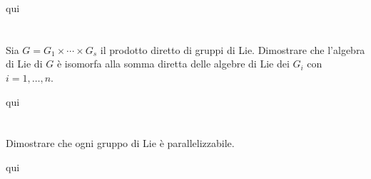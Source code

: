 qui

\section{}\label{es3-11}

\begin{tcolorbox}
	Sia $ G = G_{1} \times \cdots \times G_{s} $ il prodotto diretto di gruppi di Lie. Dimostrare che l'algebra di Lie di $ G $ è isomorfa alla somma diretta delle algebre di Lie dei $ G_{i} $ con $ i=1,\dots,n $.
\end{tcolorbox}

qui

\section{}\label{es1-12}

\begin{tcolorbox}
	Dimostrare che ogni gruppo di Lie è parallelizzabile.
\end{tcolorbox}

qui
